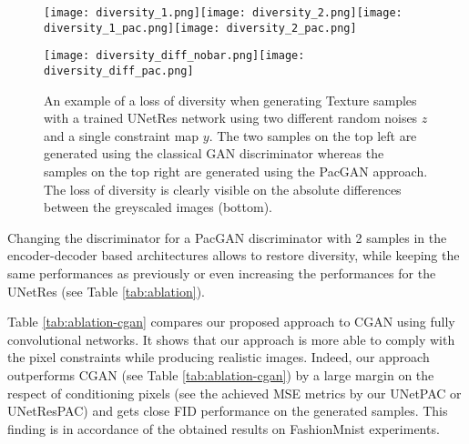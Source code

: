 \begin{figure}
	\centering
	\texttt{[image: diversity\_1.png]}\hspace{0.5cm}\texttt{[image: diversity\_2.png]}\hspace{0.5cm}\texttt{[image: diversity\_1\_pac.png]}\hspace{0.5cm}\texttt{[image: diversity\_2\_pac.png]}
	
	\vspace{0.3cm}
	\texttt{[image: diversity\_diff\_nobar.png]}\hspace{0.5cm}\texttt{[image: diversity\_diff\_pac.png]}
	\caption[An example of a loss of diversity]{An example of a loss of diversity when generating Texture samples with a trained UNetRes network using two different random noises $z$ and a single constraint map $y$. The two samples on the top left are generated using the classical GAN discriminator whereas the samples on the top right are generated using the PacGAN approach. The loss of diversity is clearly visible on the absolute differences between the greyscaled images (bottom).}
	\label{fig:diversity_loss}
\end{figure}

Changing the discriminator for a PacGAN discriminator with 2 samples in the encoder-decoder based architectures allows to restore diversity, while keeping the same performances as previously or even increasing the performances for the UNetRes (see Table \ref{tab:ablation}).

Table \ref{tab:ablation-cgan} compares our proposed approach to CGAN using fully convolutional networks. It shows that our approach is more able to comply with the pixel constraints while producing realistic images. Indeed, our approach outperforms CGAN (see Table \ref{tab:ablation-cgan}) by a large margin on the respect of conditioning pixels (see the achieved MSE metrics by  our UNetPAC or UNetResPAC)  and gets  close FID performance on the generated samples. This finding is in accordance of the obtained results on FashionMnist experiments.


